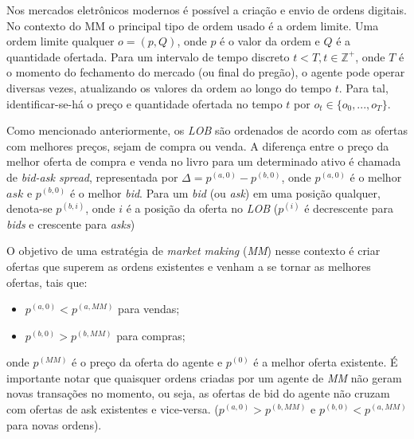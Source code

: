 Nos mercados eletrônicos modernos é possível a criação e envio de ordens digitais. No contexto do MM o principal tipo de ordem usado é a ordem limite. Uma ordem limite qualquer $o = (p, Q)$, onde $p$ é o valor da ordem e $Q$ é a quantidade ofertada. Para um intervalo de tempo discreto $t < T, t \in \mathbb{Z^{+}}$, onde $T$ é o momento do fechamento do mercado (ou final do pregão), o agente pode operar diversas vezes, atualizando os valores da ordem ao longo do tempo $t$. Para tal, identificar-se-há o preço e quantidade ofertada no tempo $t$ por $o_{t} \in \{o_{0}, ..., o_{T}\}$.

Como mencionado anteriormente, os \textit{LOB} são ordenados de acordo com as ofertas com melhores preços, sejam de compra ou venda. A diferença entre o preço da melhor oferta de compra e venda no livro para um determinado ativo é chamada de \textit{bid-ask spread}, representada por $\Delta = p^{(a, 0)} - p^{(b, 0)}$, onde $p^{(a, 0)}$ é o melhor $ask$ e $p^{(b, 0)}$ é o melhor \textit{bid}. Para um \textit{bid} (ou \textit{ask}) em uma posição qualquer, denota-se $p^{(b, i)}$, onde $i$ é a posição da oferta no \textit{LOB} ($p^{(i)}$ é decrescente para \textit{bids} e crescente para \textit{asks})

O objetivo de uma estratégia de \textit{market making} (\textit{MM}) nesse contexto é criar ofertas que superem as ordens existentes e venham a se tornar as melhores ofertas, tais que: 

\begin{itemize}
    \item $p^{(a, 0)} < p^{(a, MM)}$ para vendas;
    \item $p^{(b, 0)} > p^{(b, MM)}$ para compras;
\end{itemize}

onde $p^{(MM)}$ é o preço da oferta do agente e  $p^{(0)}$ é a melhor oferta existente.
É importante notar que quaisquer ordens criadas por um agente de \textit{MM} não geram novas transações no momento, ou seja, as ofertas de bid do agente não cruzam com ofertas de ask existentes e vice-versa. ($p^{(a, 0)} > p^{(b, MM)}$ e $p^{(b, 0)} < p^{(a, MM)}$ para novas ordens).

